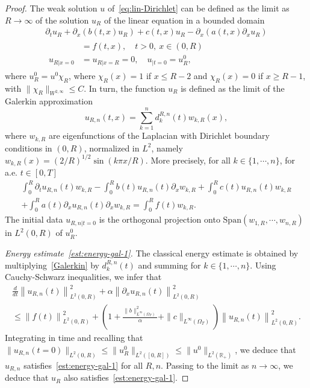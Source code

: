 \documentclass[AHL,Unicode,longabstracts,published]{cedram}
\newcommand{\R}{\mathbb{R}}
\newcommand{\p}{\partial}
\newcommand{\Span}{\mathrm{Span}}
\begin{document}
\begin{proof}
The weak solution $u$ of~\eqref{eq:lin-Dirichlet} can be defined as the limit as $R\to \infty$ of the solution $u_R$ of the linear equation in a bounded domain
\begin{multline}\label{eq:uR}
\p_t u_R +\p_x(b(t,x) u_R)+ c(t,x) u_R -\p_{x}(a(t,x) \p_x u_R)\\
\begin{aligned}
&=f(t,x),\quad t>0, \ x\in (0,R)\\
u_{R|x=0} &=u_{R|x=R}=0,\quad u_{|t=0}=u^0_R,
\end{aligned}
\end{multline}
where $u^0_R=u^0 \chi_R$, where $\chi_R(x)=1$ if $x\leq R-2$ and $\chi_R(x)=0$ if $x\geq R-1$, with $\|\chi_R\|_{W^{2,\infty}}\leq C$. In turn, the function $u_R$ is defined as the limit of the Galerkin approximation
\[
u_{R,n}(t,x)=\sum_{k=1}^n d^{R,n}_k(t) w_{k,R}(x),
\]
where $w_{k,R}$ are eigenfunctions of the Laplacian with Dirichlet boundary conditions in $(0,R)$, normalized in $L^2$, namely $w_{k,R}(x)= (2/R)^{1/2} \sin (k\pi x/R)$. More precisely, for all $k\in \{1,\cdots,n\} $, for a.e. $t\in [0,T]$
\begin{multline}\label{Galerkin}
\int_0^R\p_t u_{R,n}(t)w_{k,R} - \int_0^R b(t)u_{R,n}(t) \p_x w_{k,R} + \int_0^R c(t)u_{R,n}(t) w_{k,R}
\\ + \int_0^R a(t) \p_x u_{R,n}(t) \p_x w_{k,R} =\int_0^R f(t) w_{k,R}.
\end{multline}
The initial data $u_{R,n|t=0}$ is the orthogonal projection onto $\Span (w_{1,R},\cdots, w_{n,R})$ in $L^2(0,R)$ of $u_R^0$.

\emph{Energy estimate~\eqref{est:energy-gal-1}.}
The classical energy estimate is obtained by multiplying~\eqref{Galerkin} by $d^{R,n}_k(t)$ and summing for $k\in \{1,\cdots, n\}$. Using Cauchy-Schwarz inequalities, we infer that
\begin{multline}
\frac{d}{dt}\left\| u_{R,n}(t)\right\|_{L^2(0,R)}^2 + \alpha \left\| \p_x u_{R,n}(t)\right\|_{L^2(0,R)}^2 \\
\leq \left\|f(t)\right\|_{L^2(0,R)}^2 + \left(1 + \frac{\|b\|_{L^\infty(\Omega_T)}^2}{\alpha} + \|c\|_{L^\infty(\Omega_T)}\right) \left\| u_{R,n}(t)\right\|_{L^2(0,R)}^2.
\end{multline}
Integrating in time and recalling that $\| u_{R,n}(t=0)\|_{L^2(0,R)} \leq \| u_R^0\|_{L^2([0,R])}\leq \| u^0\|_{L^2(\R_+)}$, we deduce that $u_{R,n}$ satisfies~\eqref{est:energy-gal-1} for all $R,n$. Passing to the limit as $n\to \infty$, we deduce that $u_R$ also satisfies~\eqref{est:energy-gal-1}.


\end{proof}
\end{document}
